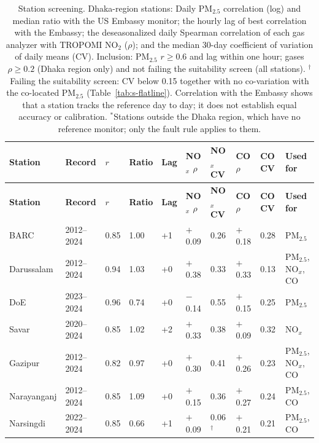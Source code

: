\begingroup\footnotesize
\begin{longtable}{L{2.9cm} C{1.4cm} C{1.0cm} C{1.0cm} C{0.9cm} C{1.2cm} C{1.1cm} C{1.2cm} C{1.1cm} L{2.2cm}}
\caption{Station screening. Dhaka-region stations: Daily PM$_{2.5}$ correlation (log) and median ratio with the US Embassy monitor; the hourly lag of best correlation with the Embassy; the deseasonalized daily Spearman correlation of each gas analyzer with TROPOMI NO$_2$ ($\rho$); and the median 30-day coefficient of variation of daily means (CV). Inclusion: PM$_{2.5}$ $r\geq0.6$ and lag within one hour; gases $\rho\geq0.2$ (Dhaka region only) and not failing the suitability screen (all stations). $^{\dagger}$Failing the suitability screen: CV below 0.15 together with no co-variation with the co-located PM$_{2.5}$ (Table~\ref{tab:s-flatline}). Correlation with the Embassy shows that a station tracks the reference day to day; it does not establish equal accuracy or calibration. $^{*}$Stations outside the Dhaka region, which have no reference monitor; only the fault rule applies to them.}\label{tab:s-screening}\\
\toprule
\textbf{Station} & \textbf{Record} & \textbf{$r$} & \textbf{Ratio} & \textbf{Lag} & \textbf{NO$_x$ $\rho$} & \textbf{NO$_x$ CV} & \textbf{CO $\rho$} & \textbf{CO CV} & \textbf{Used for} \\
\midrule\endfirsthead
\toprule
\textbf{Station} & \textbf{Record} & \textbf{$r$} & \textbf{Ratio} & \textbf{Lag} & \textbf{NO$_x$ $\rho$} & \textbf{NO$_x$ CV} & \textbf{CO $\rho$} & \textbf{CO CV} & \textbf{Used for} \\
\midrule\endhead
\bottomrule\endfoot
BARC & 2012--2024 & 0.85 & 1.00 & +1 & $+$0.09 & 0.26 & $+$0.18 & 0.28 & PM$_{2.5}$ \\
Darussalam & 2012--2024 & 0.94 & 1.03 & +0 & $+$0.38 & 0.33 & $+$0.33 & 0.13 & PM$_{2.5}$, NO$_x$, CO \\
DoE & 2023--2024 & 0.96 & 0.74 & +0 & $-$0.14 & 0.55 & $+$0.15 & 0.25 & PM$_{2.5}$ \\
Savar & 2020--2024 & 0.85 & 1.02 & +2 & $+$0.33 & 0.38 & $+$0.09 & 0.32 & NO$_x$ \\
Gazipur & 2012--2024 & 0.82 & 0.97 & +0 & $+$0.30 & 0.41 & $+$0.26 & 0.23 & PM$_{2.5}$, NO$_x$, CO \\
Narayanganj & 2012--2024 & 0.85 & 1.09 & +0 & $+$0.15 & 0.36 & $+$0.27 & 0.24 & PM$_{2.5}$, CO \\
Narsingdi & 2022--2024 & 0.85 & 0.66 & +1 & $+$0.09 & 0.06$^{\dagger}$ & $+$0.21 & 0.21 & PM$_{2.5}$, CO \\

\end{longtable}
